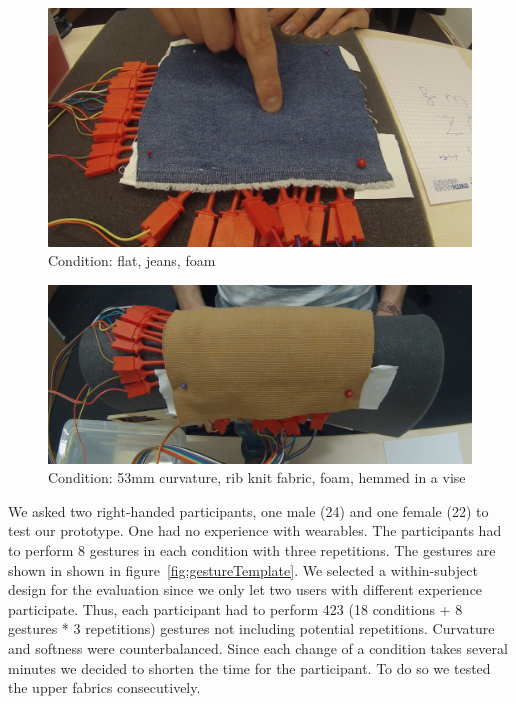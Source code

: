 \begin{figure}
\includegraphics[scale=0.15]{images/topview.jpg}
\caption{Condition: flat, jeans, foam}
\label{fig:topview}
\end{figure}\begin{figure}
\includegraphics[scale=0.15]{images/53mmtopview.jpg}
\caption{Condition: 53mm curvature, rib knit fabric, foam, hemmed in  a vise}
\label{fig:53mmtopview}
\end{figure}We asked two right-handed participants, one male (24) and one female (22) to test our prototype. One had no experience with wearables. The participants had to perform 8 gestures in each condition with three repetitions. The gestures are shown in shown in figure~\ref{fig:gestureTemplate}. We selected a within-subject design for the evaluation since we only let two users with different experience participate. Thus, each participant had to perform 423 (18 conditions + 8  gestures * 3 repetitions) gestures not including potential repetitions. Curvature and softness were counterbalanced. Since each change of a condition takes several minutes we decided to shorten the time for the participant. To do so we tested the upper fabrics consecutively. \\
